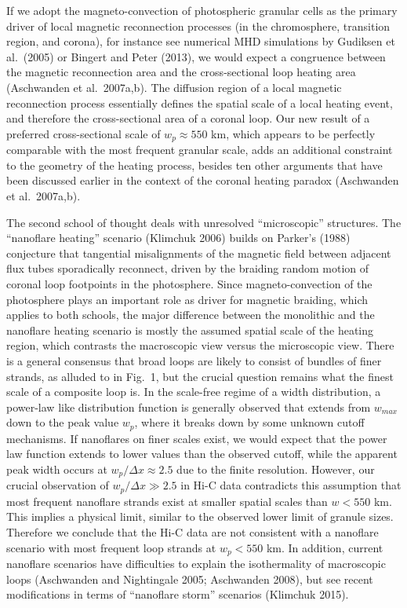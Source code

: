 \documentclass[10pt,preprint]{aastex}  %
\begin{document}
If we adopt the magneto-convection of photospheric granular cells
as the primary driver of local magnetic reconnection processes
(in the chromosphere, transition region, and corona), for instance
see numerical MHD simulations by Gudiksen et al.~(2005) 
or Bingert and Peter (2013),
we would expect a congruence between the magnetic reconnection
area and the cross-sectional loop heating area (Aschwanden et al.~2007a,b). 
The diffusion region of a local magnetic reconnection process essentially
defines the spatial scale of a local heating event, and therefore
the cross-sectional area of a coronal loop. 
Our new result of a preferred cross-sectional scale of $w_p \approx
550$ km, which appears to be perfectly comparable with the most
frequent granular scale, adds an additional constraint to the geometry 
of the heating process, besides ten other arguments that have been 
discussed earlier in the context of the coronal heating paradox 
(Aschwanden et al.~2007a,b).

The second school of thought deals with unresolved ``microscopic''
structures. The ``nanoflare heating'' scenario (Klimchuk 2006) 
builds on Parker's (1988) conjecture
that tangential misalignments of the magnetic field between adjacent
flux tubes sporadically reconnect, driven by the braiding random
motion of coronal loop footpoints in the photosphere. Since
magneto-convection of the photosphere plays an important role
as driver for magnetic braiding, which applies to both schools,
the major difference between
the monolithic and the nanoflare heating scenario is mostly the
assumed spatial scale of the heating region, which contrasts 
the macroscopic view versus the microscopic view. There is a general
consensus that broad loops are likely to consist of bundles of
finer strands, as alluded to in Fig.~1, but the crucial question 
remains what the finest scale of a composite loop is. In the
scale-free regime of a width distribution, a power-law like
distribution function is generally observed that extends from
$w_{max}$ down
to the peak value $w_p$, where it breaks down by some unknown
cutoff mechanisms. If nanoflares on finer scales exist, we would
expect that the power law function extends to lower values than
the observed cutoff, while the apparent peak width occurs at
$w_p/\Delta x \approx 2.5$ due to the finite resolution. However, 
our crucial observation of $w_p/\Delta x \gg 2.5$ in Hi-C data
contradicts this assumption that most frequent nanoflare strands 
exist at smaller spatial scales than $w < 550$ km. This implies a physical
limit, similar to the observed lower limit of granule sizes.
Therefore we conclude that the Hi-C data are not consistent with
a nanoflare scenario with most frequent loop strands at $w_p < 550$ km. 
In addition, current nanoflare scenarios have difficulties to explain the
isothermality of macroscopic loops (Aschwanden and Nightingale 2005;
Aschwanden 2008), but see recent modifications in terms of
``nanoflare storm'' scenarios (Klimchuk 2015).
\end{document}
